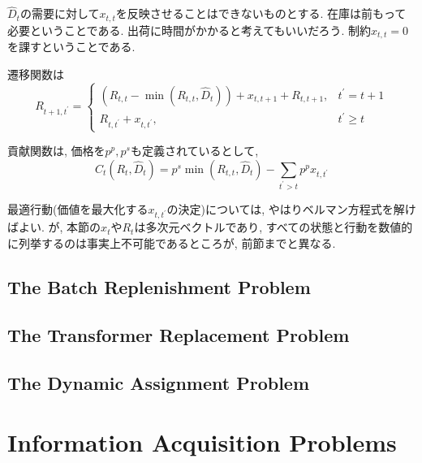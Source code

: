 \documentclass[11pt]{jsbook}
\begin{document}
$\hat{D}_t$の需要に対して$x_{t,t}$を反映させることはできないものとする.
在庫は前もって必要ということである. 出荷に時間がかかると考えてもいいだろう.
制約$x_{t,t} = 0$を課すということである.

遷移関数は
\begin{equation}
	R_{t+1,t^\prime} = \begin{cases}
		\left( R_{t,t} - \min (R_{t,t}, \hat{D}_t) \right) + x_{t,t+1} + R_{t,t+1}, &t^\prime = t+1\\
		R_{t,t^\prime} + x_{t,t^\prime}, &t^\prime \ge t
	\end{cases}
\end{equation}

貢献関数は, 価格を$p^p,p^s$も定義されているとして,
\begin{equation}
	C_t(R_t, \hat{D}_t) = p^s \min (R_{t,t}, \hat{D}_t) - \sum_{t^\prime > t} p^p x_{t,t^\prime} 
\end{equation}

最適行動(価値を最大化する$x_{t,t^\prime}$の決定)については, やはりベルマン方程式を解けばよい.
が, 本節の$x_t$や$R_t$は多次元ベクトルであり,
すべての状態と行動を数値的に列挙するのは事実上不可能であるところが, 前節までと異なる.

\subsection{The Batch Replenishment Problem}
\subsection{The Transformer Replacement Problem}
\subsection{The Dynamic Assignment Problem}

\section{Information Acquisition Problems}
\end{document}
